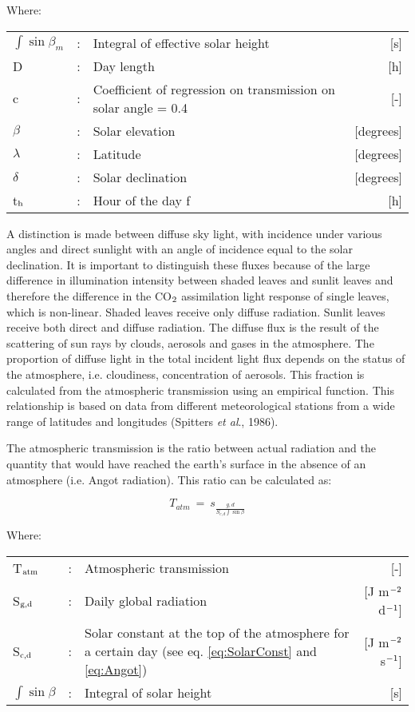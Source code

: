 Where:\\[5pt]
\begin{tabularx}{\textwidth}{llXr}
	$\int \sin \beta_{m}$  &:& Integral of effective solar height   & [s]\\
	D  &:& Day length       & [h]\\
	c  &:& Coefficient of regression on transmission on solar angle = 0.4  & [-]\\
	$\beta$  &:& Solar elevation   & [degrees]\\
	$\lambda$  &:& Latitude   & [degrees]\\
	$\delta$  &:& Solar declination   & [degrees]\\
	t$_{{\rm h}}$  &:& Hour of the day  f & [h]\\
\end{tabularx}

A distinction is made between diffuse sky light, with incidence under various angles and
direct sunlight with an angle of incidence equal to the solar declination. It is important 
to distin\-guish these fluxes because of the large difference in illumination intensity 
between shaded leaves and sunlit leaves and therefore the difference in the CO$_{{\rm 2}}$ 
assimila\-tion light response of single leaves, which is non-linear. Shaded leaves receive 
only diffuse radiation. Sunlit leaves receive both direct and diffuse radiation. The 
diffuse flux is the result of the scattering of sun rays by clouds, aerosols and gases in 
the atmo\-sphere. The propor\-tion of diffuse light in the total incident light flux depends 
on the status of the atmosphere, i.e. cloudi\-ness, concentra\-tion of aerosols. This 
fraction is calculated from the atmospheric transmis\-sion using an empirical function. 
This relationship is based on data from different meteorologi\-cal stations from a wide 
range of latitudes and longitudes (Spitters {\it et al}., 1986). 

The atmospheric transmission is the ratio between actual radiation and the quantity that
would have reached the earth's surface in the absence of an atmosphere (i.e. Angot
radiation). This ratio can be calculated as:

\begin{equation}
\label{eq:Tatm}
T _{atm} ~=~ s _{\frac{g,d}{S _{c,d} \int \sin \beta }}
\end{equation}

Where:\\[5pt]
\begin{tabularx}{\textwidth}{llXr}
	T$_{{\rm atm}}$ &:& Atmospheric transmission  & [-]\\
	S$_{{\rm g,d}}$ &:& Daily global radiation  & [J m$^{{\rm -2}}$ d$^{{\rm -1}}$]\\
	S$_{{\rm c,d}}$ &:& Solar constant at the top of the atmosphere for a certain day 
	(see eq. \ref{eq:SolarConst} and \ref{eq:Angot})  & [J m$^{{\rm -2}}$ s$^{{\rm -1}}$]\\
	$\int \sin \beta$  &:& Integral of solar height   & [s]\\
\end{tabularx}

